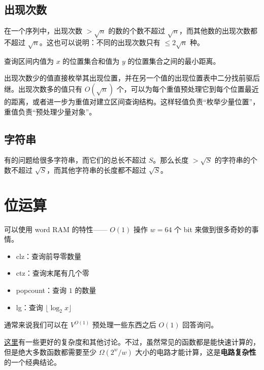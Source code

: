 \subsection{出现次数}

在一个序列中，出现次数 $> \sqrt{n}$ 的数的个数不超过 $\sqrt{n}$，而其他数的出现次数都不超过 $\sqrt{n}$。这也可以说明：不同的出现次数只有 $\le 2\sqrt{n}$ 种。

\begin{example}
    查询区间内值为 $x$ 的位置集合和值为 $y$ 的位置集合之间的最小距离。    
\end{example}
\begin{solution}
    出现次数少的值直接枚举其出现位置，并在另一个值的出现位置表中二分找前驱后继。出现次数多的值只有 $O(\sqrt n)$ 个，可以为每个重值预处理它到每个位置最近的距离，或者进一步为重值对建立区间查询结构。这样轻值负责“枚举少量位置”，重值负责“预处理少量对象”。
\end{solution}

\subsection{字符串}

有的问题给很多字符串，而它们的总长不超过 $S$。那么长度 $>\sqrt{S}$ 的字符串的个数不超过 $\sqrt{S}$，而其他字符串的长度都不超过 $\sqrt{S}$。

\section{位运算}

可以使用 word RAM 的特性—— $O(1)$ 操作 $w=64$ 个 bit 来做到很多奇妙的事情。

\begin{example}[常见操作]
    \begin{itemize}
        \item clz：查询前导零数量
        \item ctz：查询末尾有几个零
        \item popcount：查询 $1$ 的数量
        \item lg：查询 $\lfloor \log_2 x \rfloor$
    \end{itemize}
    通常来说我们可以在 $V^{O(1)}$ 预处理一些东西之后 $O(1)$ 回答询问。
\end{example}
\begin{remark}
    \href{https://www.zhihu.com/people/hqztrue/posts}{这里}有一些更好的复杂度和其他讨论。不过，虽然常见的函数都是能快速计算的，但是绝大多数函数都需要至少 $\Omega(2^w/w)$ 大小的电路才能计算，这是\textbf{电路复杂性}的一个经典结论。
\end{remark}

